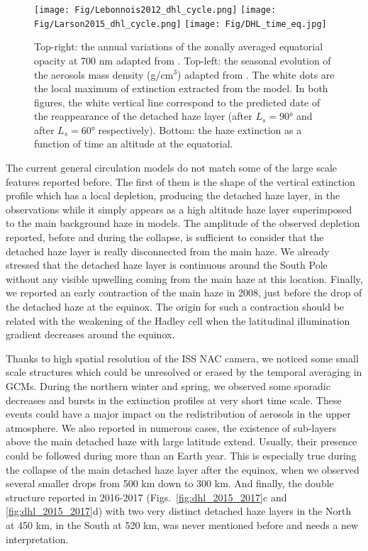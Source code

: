 \begin{figure}[!ht]
    \centering
    \texttt{[image: Fig/Lebonnois2012\_dhl\_cycle.png]}
    \texttt{[image: Fig/Larson2015\_dhl\_cycle.png]}
    \texttt{[image: Fig/DHL\_time\_eq.jpg]}
    \caption{Top-right: the annual variations of the zonally averaged equatorial opacity at 700 nm adapted
        from \cite{Lebonnois2012}.
        Top-left: the seasonal evolution of the aerosols mass density (g/cm$^3$) adapted from \cite{Larson2015}. The white dots are the local maximum of extinction extracted from the model.
        In both figures, the white vertical line correspond to the predicted date of the reappearance of the
        detached haze layer (after $L_s = \ang{90}$ and after $L_s = \ang{60}$ respectively).
        Bottom: the haze extinction as a function of time an altitude at the equatorial.
    }
    \label{fig:gcm_cycle}
\end{figure}

The current general circulation models do not match some of the large scale features reported before. The first of them
is the shape of the vertical extinction profile which has a local depletion, producing the detached haze layer, in the
observations while it simply appears as a high altitude haze layer superimposed to the main background haze in models.
The amplitude of the observed depletion reported, before and during the collapse, is sufficient to consider that the
detached haze layer is really disconnected from the main haze. We already stressed that the detached haze layer is
continuous around the South Pole without any visible upwelling coming from the main haze at this location. Finally, we
reported an early contraction of the main haze in 2008, just before the drop of the detached haze at the equinox. The origin
for such a contraction should be related with the weakening of the Hadley cell when the latitudinal illumination gradient
decreases around the equinox.

Thanks to high spatial resolution of the ISS NAC camera, we noticed some small scale structures which could be unresolved or
erased by the temporal averaging in GCMs. During the northern winter and spring, we observed some sporadic decreases and
bursts in the extinction profiles at very short time scale. These events could have a major impact on the redistribution of
aerosols in the upper atmosphere. We also reported in numerous cases, the existence of sub-layers above the main detached
haze with large latitude extend. Usually, their presence could be followed during more than an Earth year. This is
especially true during the collapse of the main detached haze layer after the equinox, when we observed several smaller
drops from 500 km down to 300 km. And finally, the double structure reported in 2016-2017
(Figs.~\ref{fig:dhl_2015_2017}c and \ref{fig:dhl_2015_2017}d) with two very distinct detached haze layers in the
North at 450 km, in the South at 520 km, was never mentioned before and needs a new interpretation.

